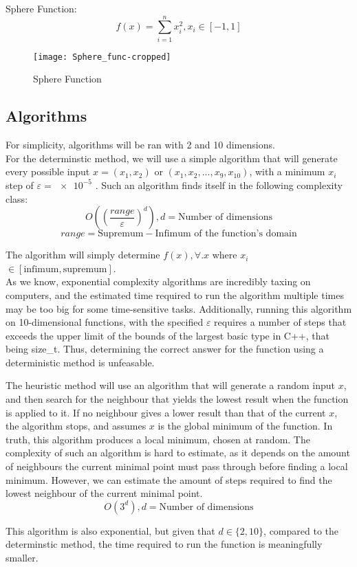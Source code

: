 \documentclass{article}
\begin{document}
Sphere Function:
$$ f(x) = \sum_{i = 1}^n x_i^2, x_i \in \left[ -1, 1 \right]$$
\begin{figure}[H]
  \texttt{[image: Sphere\_func-cropped]}
  \caption{Sphere Function}
\end{figure}

\subsection{Algorithms}
For simplicity, algorithms will be ran with 2 and 10 dimensions.
\\For the determinstic method, we will use a simple algorithm that will generate every possible input $x = (x_1, x_2)$ or $(x_1, x_2, ..., x_9, x_{10})$, with a minimum $x_i$ step of $\varepsilon = \num{e-5}$ . Such an algorithm finds itself in the following complexity class:
$$O\left(\left(\frac{range}{\varepsilon}\right)^d\right), d = \text{Number of dimensions}$$
$$range = \text{Supremum} - \text{Infimum of the function's domain} $$

The algorithm will simply determine $f(x), \forall. x$ where $x_i$ $\in \left[ \text{infimum}, \text{supremum} \right]$.
\\As we know, exponential complexity algorithms are incredibly taxing on computers, and the estimated time required to run the algorithm multiple times may be too big for some time-sensitive tasks. Additionally, running this algorithm on 10-dimensional functions, with the specified $\varepsilon$ requires a number of steps that exceeds the upper limit of the bounds of the largest basic type in C++, that being size\_t. Thus, determining the correct answer for the function using a deterministic method is unfeasable.

The heuristic method will use an algorithm that will generate a random input $x$, and then search for the neighbour that yields the lowest result when the function is applied to it. If no neighbour gives a lower result than that of the current $x$, the algorithm stops, and assumes $x$ is the global minimum of the function. In truth, this algorithm produces a local minimum, chosen at random.
The complexity of such an algorithm is hard to estimate, as it depends on the amount of neighbours the current minimal point must pass through before finding a local minimum. However, we can estimate the amount of steps required to find the lowest neighbour of the current minimal point.
$$ O\left(3^d\right), d = \text{Number of dimensions} $$

This algorithm is also exponential, but given that $d \in \{2, 10\}$, compared to the determinstic method, the time required to run the function is meaningfully smaller.
\end{document}
